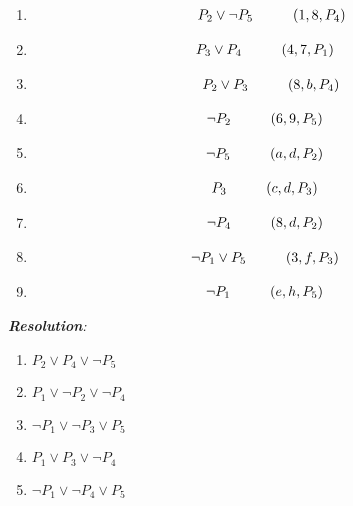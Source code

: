 \documentclass[a4paper,12pt, centered]{article}
\newcommand\tab[1][1cm]{\hspace*{#1}}
\begin{document}
\begin{enumerate}
\begin{multicols}{3}
	\end{multicols}
	\begin{multicols}{2}
		\begin{enumerate}
			\item \begin{align*}
				P_2\lor\neg P_5\tab (1,8,P_4)
			\end{align*}
			\item \begin{align*}
				P_3\lor P_4\tab & (4,7,P_1)
			\end{align*}
			\item \begin{align*}
				P_2\lor P_3\tab (8,b,P_4)
			\end{align*}
			\item \begin{align*}
				\neg P_2\tab & (6,9,P_5) 
			\end{align*}
			\item \begin{align*}
				\neg P_5\tab & (a,d,P_2)
			\end{align*}
			\item \begin{align*}
				P_3\tab & (c,d,P_3)
			\end{align*}
			\item \begin{align*}
				\neg P_4\tab & (8,d,P_2)
			\end{align*}
			\item \begin{align*}
				\neg P_1\lor P_5\tab & (3,f,P_3)
			\end{align*}
			\item \begin{align*}
				\neg P_1\tab & (e,h,P_5)
			\end{align*}
		\end{enumerate}
	\end{multicols}
	\emph{\textbf{Resolution}:}\\
	\begin{multicols}{3}
		\begin{enumerate}[(1)] 
			\item $P_2 \lor P_4 \lor  \neg P_5$
			\item $P_1 \lor  \neg P_2 \lor  \neg P_4$
			\item $\neg P_1 \lor  \neg P_3 \lor P_5$
			\item $ P_1 \lor P_3 \lor  \neg P_4$
			\item $\neg P_1 \lor  \neg P_4 \lor P_5$

\end{enumerate}
\end{multicols}
\end{enumerate}
\end{document}

